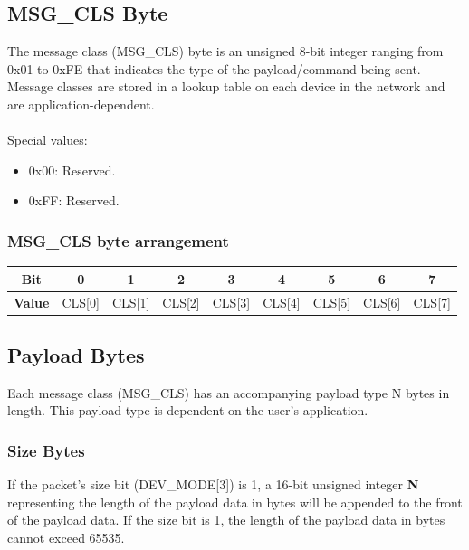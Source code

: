 \documentclass{article}
\begin{document}
    \subsection{MSG\_CLS Byte}
    The message class (MSG\_CLS) byte is an unsigned 8-bit integer ranging from 0x01 to 0xFE that
    indicates the type of the payload/command being sent. Message classes are
    stored in a lookup table on each device in the network and are application-dependent.\\
    \\
    Special values:
    \begin{itemize}
        \item 0x00: Reserved.
        \item 0xFF: Reserved.
    \end{itemize}

    \subsubsection{MSG\_CLS byte arrangement}

    \begin{table}[h]
        \centering
        \begin{tabular}{|c|c|c|c|c|c|c|c|c|}
            \hline
            \textbf{Bit}   & 0      & 1      & 2      & 3      & 4      & 5      & 6      & 7      \\
            \hline
            \textbf{Value} & CLS[0] & CLS[1] & CLS[2] & CLS[3] & CLS[4] & CLS[5] & CLS[6] & CLS[7] \\
            \hline
        \end{tabular}
    \end{table}

    \subsection{Payload Bytes}
    Each message class (MSG\_CLS) has an accompanying payload type N bytes in length. This payload type is dependent on the user's application.

    \subsubsection{Size Bytes}
    If the packet's size bit (DEV\_MODE[3]) is 1, a 16-bit unsigned integer \textbf{N} representing the length of the payload data in bytes will be appended to the front of the payload data. If the size bit is 1, the length of the payload data in bytes cannot exceed 65535.
\end{document}
